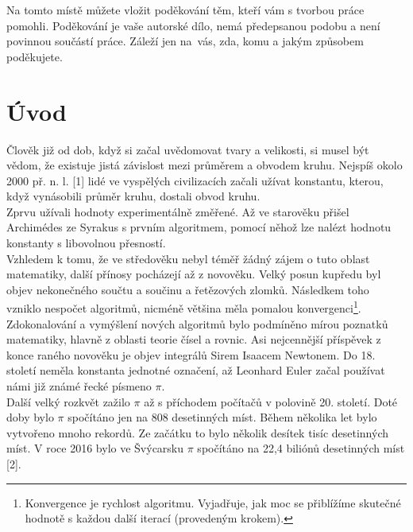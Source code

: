\documentclass[rocnikovka]{gzwroc} %
\begin{document}
\titulnistrana %
\prohlaseni %
\podekovani %
Na tomto místě můžete vložit poděkování těm, kteří vám s tvorbou práce pomohli. Poděkování je vaše autorské dílo, nemá předepsanou podobu a není povinnou součástí práce. Záleží jen na~vás, zda, komu a jakým způsobem poděkujete.
\newpage %
\vyrobanotaci %
\tableofcontents %
\newpage %
\section{Úvod} %
Člověk již od dob, když si začal uvědomovat tvary a velikosti, si musel být vědom, že existuje jistá závislost mezi průměrem a obvodem kruhu. Nejspíš okolo 2000 př. n. l. [1] lidé ve vyspělých civilizacích začali užívat konstantu, kterou, když vynásobili průměr kruhu, dostali obvod kruhu.\\
Zprvu užívali hodnoty experimentálně změřené. Až ve starověku přišel Archimédes ze Syrakus s prvním algoritmem, pomocí něhož lze nalézt hodnotu konstanty s libovolnou přesností.\\
Vzhledem k tomu, že ve středověku nebyl téměř žádný zájem o tuto oblast matematiky, další přínosy pocházejí až z novověku. Velký posun kupředu byl objev nekonečného součtu a součinu a řetězových zlomků. Následkem toho vzniklo nespočet algoritmů, nicméně většina měla pomalou konvergenci\footnote[1]{Konvergence je rychlost algoritmu. Vyjadřuje, jak moc se přiblížíme skutečné hodnotě s každou další iterací (provedeným krokem).}.\\
Zdokonalování a vymýšlení nových algoritmů bylo podmíněno mírou poznatků matematiky, hlavně z oblasti teorie čísel a rovnic. Asi nejcennější příspěvek z konce raného novověku je objev integrálů Sirem Isaacem Newtonem. Do 18. století neměla konstanta jednotné označení, až Leonhard Euler začal používat námi již známé řecké písmeno $\pi$.\\
Další velký rozkvět zažilo $\pi$ až s příchodem počítačů v polovině 20. století. Doté doby bylo $\pi$ spočítáno jen na 808 desetinných míst. Během několika let bylo vytvořeno mnoho rekordů. Ze začátku to bylo několik desítek tisíc desetinných míst. V roce 2016 bylo ve Švýcarsku $\pi$ spočítáno na 22,4 biliónů desetinných míst [2].\\
\end{document}
